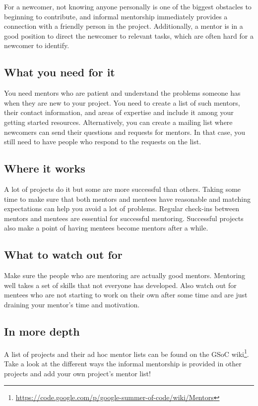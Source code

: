 For a newcomer, not knowing anyone personally is one of the biggest obstacles to beginning to contribute, and informal mentorship immediately provides a connection with a friendly person in the project. Additionally, a mentor is in a good position to direct the newcomer to relevant tasks, which are often hard for a newcomer to identify.

\subsection{What you need for it}
You need mentors who are patient and understand the problems someone has when they are new to your project. You need to create a list of such mentors, their contact information, and areas of expertise and include it among your getting started resources. Alternatively, you can create a mailing list where newcomers can send their questions and requests for mentors. In that case, you still need to have people who respond to the requests on the list.

\subsection{Where it works}
A lot of projects do it but some are more successful than others. Taking some time to make sure that both mentors and mentees have reasonable and matching expectations can help you avoid a lot of problems. Regular check-ins between mentors and mentees are essential for successful mentoring. Successful projects also make a point of having mentees become mentors after a while.

\subsection{What to watch out for}
Make sure the people who are mentoring are actually good mentors. Mentoring well takes a set of skills that not everyone has developed. Also watch out for mentees who are not starting to work on their own after some time and are just draining your mentor’s time and motivation.

\subsection{In more depth}
A list of projects and their ad hoc mentor lists can be found on the GSoC wiki\footnote{\url{https://code.google.com/p/google-summer-of-code/wiki/Mentors}}. Take a look at the different ways the informal mentorship is provided in other projects and add your own project’s mentor list!

